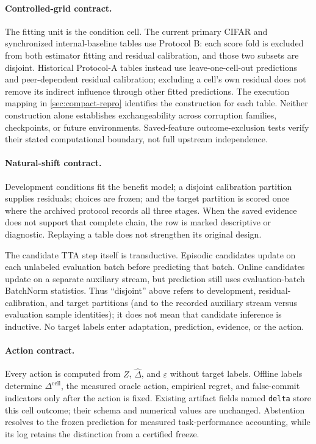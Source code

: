 \paragraph{Controlled-grid contract.}
The fitting unit is the condition cell. The current primary CIFAR and synchronized
internal-baseline tables use Protocol B: each score fold is excluded from both
estimator fitting and residual calibration, and those two subsets are disjoint.
Historical Protocol-A tables instead use leave-one-cell-out predictions and
peer-dependent residual calibration; excluding a cell's own residual does not
remove its indirect influence through other fitted predictions. The execution
mapping in \ref{sec:compact-repro} identifies the construction for each table.
Neither construction alone establishes exchangeability across corruption
families, checkpoints, or future environments. Saved-feature outcome-exclusion
tests verify their stated computational boundary, not full upstream independence.

\paragraph{Natural-shift contract.}
Development conditions fit the benefit model; a disjoint calibration partition supplies residuals;
choices are frozen; and the target partition is scored once where the archived protocol records all
three stages. When the saved evidence does not support that complete chain, the row is marked
descriptive or diagnostic. Replaying a table does not strengthen its original design.

The candidate TTA step itself is transductive. Episodic candidates update on each unlabeled
evaluation batch before predicting that batch. Online candidates update on a separate auxiliary
stream, but prediction still uses evaluation-batch BatchNorm statistics. Thus ``disjoint'' above
refers to development, residual-calibration, and target partitions (and to the recorded auxiliary
stream versus evaluation sample identities); it does not mean that candidate inference is
inductive. No target labels enter adaptation, prediction, evidence, or the action.

\paragraph{Action contract.}
Every action is computed from $Z$, $\widehat\Delta$, and $\varepsilon$ without target labels.
Offline labels determine $\Delta^{\mathrm{cell}}$, the measured oracle action, empirical regret,
and false-commit indicators only after the action is fixed. Existing artifact fields named
\texttt{delta} store this cell outcome; their schema and numerical values are unchanged.
Abstention resolves to the frozen prediction for measured task-performance accounting, while its log
retains the distinction from a certified freeze.

